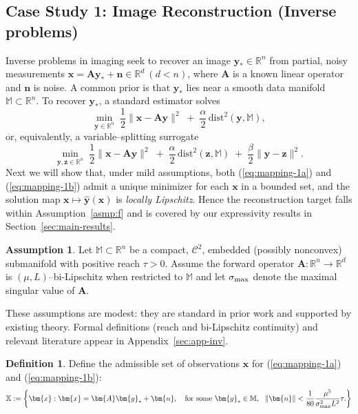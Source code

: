 \documentclass{amsart} %
\def\eqref#1{equation~\ref{#1}}
\def\vn{{\bm{n}}}
\def\vx{{\bm{x}}}
\def\vy{{\bm{y}}}
\def\vz{{\bm{z}}}
\def\mA{{\bm{A}}}
\def\sM{{\mathbb{M}}}
\def\sR{{\mathbb{R}}}
\def\sX{{\mathbb{X}}}
\def\cC{{\mathcal{C}}}
\theoremstyle{definition}
\newtheorem{definition}[theorem]{Definition}
\newtheorem{assumption}[theorem]{Assumption}
\theoremstyle{remark}
\renewcommand{\eqref}[1]{\textup{(\ref{#1})}}
\begin{document}
\subsection{Case Study 1: Image Reconstruction (Inverse problems)}

Inverse problems in imaging seek to recover an image \(\vy_\ast\in\sR^n\) from partial, noisy measurements $\vx = \mA \vy_\ast + \vn \in \sR^d ~ (d<n)$, where \(\mA\) is a known linear operator and \(\vn\) is noise. A common prior is that \(\vy_\ast\) lies near a smooth data manifold \(\sM\subset\sR^n\). To recover \(\vy_\ast\), a standard estimator solves
\begin{equation}
\label{eq:mapping-1a}
\min_{\vy\in\sR^n}\;\frac{1}{2}\|\vx-\mA\vy\|^2 \;+\; \frac{\alpha}{2}\,\mathrm{dist}^2(\vy,\sM),
\end{equation}
or, equivalently, a variable–splitting surrogate
\begin{equation}
\label{eq:mapping-1b}
\min_{\vy,\vz\in\sR^n}\;\frac{1}{2}\|\vx-\mA\vy\|^2 \;+\; \frac{\alpha}{2}\,\mathrm{dist}^2(\vz,\sM) \;+\; \frac{\beta}{2}\|\vy-\vz\|^2.
\end{equation}
Next we will show that, under mild assumptions, both \eqref{eq:mapping-1a} and \eqref{eq:mapping-1b} admit a unique minimizer for each \(\vx\) in a bounded set, and the solution map \(\vx\mapsto\hat{\vy}(\vx)\) is \emph{locally Lipschitz}. Hence the reconstruction target falls within Assumption~\ref{asmp:f} and is covered by our expressivity results in Section~\ref{sec:main-results}.



\begin{assumption}
\label{assume:M}
Let $\sM\subset\sR^n$ be a compact, $\cC^2$, embedded (possibly nonconvex) submanifold with positive reach $\tau>0$. Assume the forward operator $\mA:\sR^n\!\to\!\sR^d$ is $(\mu,L)$–bi-Lipschitz when restricted to $\sM$ and let $\sigma_{\textup{max}}$ denote the maximal singular value of $\mA$.
\end{assumption}

These assumptions are modest: they are standard in prior work and supported by existing theory. Formal definitions (reach and bi-Lipschitz continuity) and relevant literature appear in Appendix~\ref{sec:app-inv}.

\begin{definition}
\label{def:X-inv-prob}
Define the admissible set of observations $\vx$ for \eqref{eq:mapping-1a} and \eqref{eq:mapping-1b}:
\[ \sX := \left\{ \vx: \vx = \mA \vy_\ast + \vn, \quad \textup{for some }\vy_\ast \in \sM, ~~\|\vn\| < \frac{1}{80}\frac{\mu^5}{\sigma^2_{\textup{max}}L^2} \tau.  \right\}
\]
\end{definition}
\end{document}
